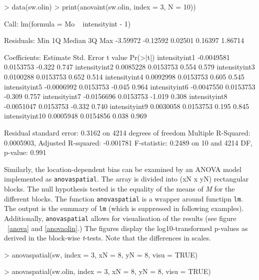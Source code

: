 \documentclass[a4paper,11pt]{article}
\begin{document}
\begin{Schunk}
\begin{Sinput}
> data(sw.olin)
> print(anovaint(sw.olin, index = 3, N = 10))
\end{Sinput}
\begin{Soutput}
Call:
lm(formula = Mo ~ intensityint - 1)

Residuals:
     Min       1Q   Median       3Q      Max 
-3.59972 -0.12592  0.02501  0.16397  1.86714 

Coefficients:
                 Estimate Std. Error t value Pr(>|t|)
intensityint1  -0.0049581  0.0153753  -0.322    0.747
intensityint2   0.0085228  0.0153753   0.554    0.579
intensityint3   0.0100288  0.0153753   0.652    0.514
intensityint4   0.0092998  0.0153753   0.605    0.545
intensityint5  -0.0006992  0.0153753  -0.045    0.964
intensityint6  -0.0047550  0.0153753  -0.309    0.757
intensityint7  -0.0156696  0.0153753  -1.019    0.308
intensityint8  -0.0051047  0.0153753  -0.332    0.740
intensityint9   0.0030058  0.0153753   0.195    0.845
intensityint10  0.0005948  0.0154856   0.038    0.969

Residual standard error: 0.3162 on 4214 degrees of freedom
Multiple R-Squared: 0.0005903,	Adjusted R-squared: -0.001781 
F-statistic: 0.2489 on 10 and 4214 DF,  p-value: 0.991 
\end{Soutput}
\end{Schunk}


Similarly, the location-dependent bias can be examined by an ANOVA model implemented as
\texttt{anovaspatial}. The array is divided into (xN x yN) rectangular blocks.   
The null hypothesis tested is the equality of the means of \emph{M} for the different blocks.  
The function \texttt{anovaspatial} is a wrapper around functipn \texttt{lm}. The output
is the summary of \texttt{lm} (which is suppressed in following examples).
Additionally,  \texttt{anovaspatial} allows for visualisation of the results (see figure
~\ref{anova} and \ref{anovaolin}.) The figures display the log10-transformed p-values
as derived in the block-wise \textit{t}-tests. Note that the differences in scales.   


\begin{Schunk}
\begin{Sinput}
> anovaspatial(sw, index = 3, xN = 8, yN = 8, visu = TRUE)
\end{Sinput}
\end{Schunk}

\begin{Schunk}
\begin{Sinput}
> anovaspatial(sw.olin, index = 3, xN = 8, yN = 8, visu = TRUE)
\end{Sinput}
\end{Schunk}
\end{document}

